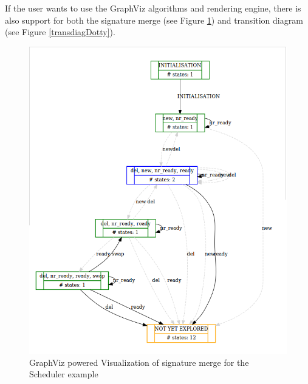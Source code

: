 If the user wants to use the GraphViz algorithms and rendering engine, there is also support for both the signature merge (see Figure \ref{sigmergeDotty}) and transition diagram (see Figure \ref{transdiagDotty}).

\begin{center}
\begin{figure}[h!]
\includegraphics[width=14cm]{bilder/dotty-sigmerge.png}
\caption{GraphViz powered Visualization of signature merge for the Scheduler example}
\label{sigmergeDotty}
\end{figure}
\end{center}

